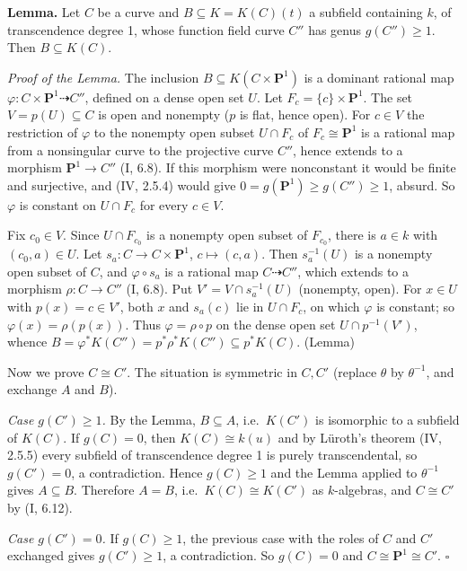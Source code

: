 \documentclass[11pt]{article}
\begin{document}
\textbf{Lemma.} Let $C$ be a curve and $B\subseteq K=K(C)(t)$ a subfield containing $k$, of transcendence degree 1, whose function field curve $C''$ has genus $g(C'')\ge1$. Then $B\subseteq K(C)$.

\emph{Proof of the Lemma.} The inclusion $B\subseteq K(C\times\mathbf P^1)$ is a dominant rational map $\varphi\colon C\times\mathbf P^1\dashrightarrow C''$, defined on a dense open set $U$. Let $F_c=\{c\}\times\mathbf P^1$. The set $V=p(U)\subseteq C$ is open and nonempty ($p$ is flat, hence open). For $c\in V$ the restriction of $\varphi$ to the nonempty open subset $U\cap F_c$ of $F_c\cong\mathbf P^1$ is a rational map from a nonsingular curve to the projective curve $C''$, hence extends to a morphism $\mathbf P^1\to C''$ (I, 6.8). If this morphism were nonconstant it would be finite and surjective, and (IV, 2.5.4) would give $0=g(\mathbf P^1)\ge g(C'')\ge1$, absurd. So $\varphi$ is constant on $U\cap F_c$ for every $c\in V$.

Fix $c_0\in V$. Since $U\cap F_{c_0}$ is a nonempty open subset of $F_{c_0}$, there is $a\in k$ with $(c_0,a)\in U$. Let $s_a\colon C\to C\times\mathbf P^1$, $c\mapsto(c,a)$. Then $s_a^{-1}(U)$ is a nonempty open subset of $C$, and $\varphi\circ s_a$ is a rational map $C\dashrightarrow C''$, which extends to a morphism $\rho\colon C\to C''$ (I, 6.8). Put $V'=V\cap s_a^{-1}(U)$ (nonempty, open). For $x\in U$ with $p(x)=c\in V'$, both $x$ and $s_a(c)$ lie in $U\cap F_c$, on which $\varphi$ is constant; so $\varphi(x)=\rho(p(x))$. Thus $\varphi=\rho\circ p$ on the dense open set $U\cap p^{-1}(V')$, whence $B=\varphi^*K(C'')=p^*\rho^*K(C'')\subseteq p^*K(C)$. \hfill(Lemma)

Now we prove $C\cong C'$. The situation is symmetric in $C,C'$ (replace $\theta$ by $\theta^{-1}$, and exchange $A$ and $B$).

\emph{Case $g(C')\ge1$.} By the Lemma, $B\subseteq A$, i.e.\ $K(C')$ is isomorphic to a subfield of $K(C)$. If $g(C)=0$, then $K(C)\cong k(u)$ and by Lüroth's theorem (IV, 2.5.5) every subfield of transcendence degree 1 is purely transcendental, so $g(C')=0$, a contradiction. Hence $g(C)\ge1$ and the Lemma applied to $\theta^{-1}$ gives $A\subseteq B$. Therefore $A=B$, i.e.\ $K(C)\cong K(C')$ as $k$-algebras, and $C\cong C'$ by (I, 6.12).

\emph{Case $g(C')=0$.} If $g(C)\ge1$, the previous case with the roles of $C$ and $C'$ exchanged gives $g(C')\ge1$, a contradiction. So $g(C)=0$ and $C\cong\mathbf P^1\cong C'$. \hfill$\square$
\end{document}
